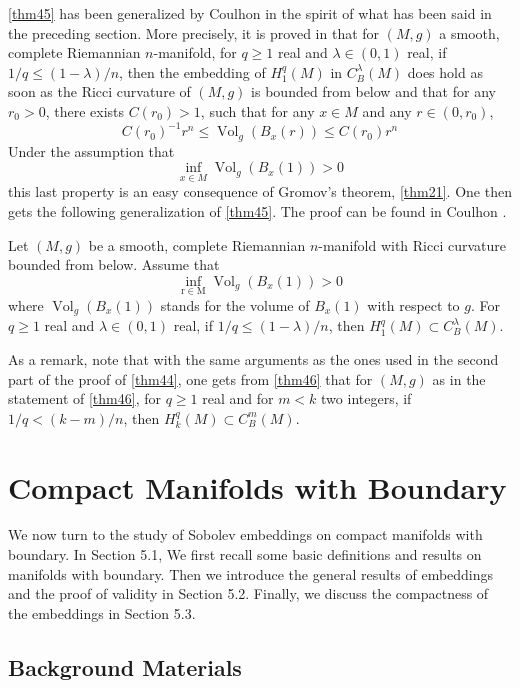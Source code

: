 \documentclass[12pt,hyperref,a4paper,UTF8]{ctexart}
\begin{document}
\vskip 3pt
\autoref{thm45} has been generalized by Coulhon \cite{Coulhon} in the spirit of what has been said in the preceding section. More precisely, it is proved in \cite{Coulhon} that for $(M, g)$ a smooth, complete Riemannian $n$-manifold, for $q \geq 1$ real and $\lambda \in(0,1)$ real, if $1 / q \leq(1-\lambda) / n$, then the embedding of $H_1^q(M)$ in $C_B^\lambda(M)$ does hold as soon as the Ricci curvature of $(M, g)$ is bounded from below and that for any $r_0>0$, there exists $C\left(r_0\right)>1$, such that for any $x \in M$ and any $r \in\left(0, r_0\right)$,
$$
C\left(r_0\right)^{-1} r^n \leq \operatorname{Vol}_g\left(B_x(r)\right) \leq C\left(r_0\right) r^n
$$
Under the assumption that
$$
\inf _{x \in M} \operatorname{Vol}_g\left(B_x(1)\right)>0
$$
this last property is an easy consequence of Gromov's theorem, \autoref{thm21}. One then gets the following generalization of \autoref{thm45}. The proof can be found in Coulhon \cite{Coulhon}.

\begin{Theorem}
    Let $(M, g)$ be a smooth, complete Riemannian $n$-manifold with Ricci curvature bounded from below. Assume that
$$
\inf _{\mathrm{r} \in \mathrm{M}} \operatorname{Vol}_g\left(B_{x}(1)\right)>0
$$
where $\operatorname{Vol}_g\left(B_x(1)\right)$ stands for the volume of $B_x(1)$ with respect to $g$. For $q \geq 1$ real and $\lambda \in(0,1)$ real, if ${1 / q \leq(1-\lambda) / n}$, then ${H_1^q(M) \subset C_B^\lambda(M)}$.
\label{thm46}
\end{Theorem}

As a remark, note that with the same arguments as the ones used in the second part of the proof of \autoref{thm44}, one gets from \autoref{thm46} that for $(M, g)$ as in the statement of \autoref{thm46}, for $q \geq 1$ real and for $m<k$ two integers, if $1 / q<(k-m) / n$, then $H_k^q(M) \subset C_B^m(M)$.

\newpage
\section{Compact Manifolds with Boundary}

We now turn to the study of Sobolev embeddings on compact manifolds with boundary. 
In Section 5.1, We first recall some basic definitions and results on manifolds with boundary. 
Then we introduce the general results of embeddings and the proof of validity in Section 5.2. Finally, we discuss the compactness of the embeddings in Section 5.3.
\subsection{Background Materials}
\end{document}
